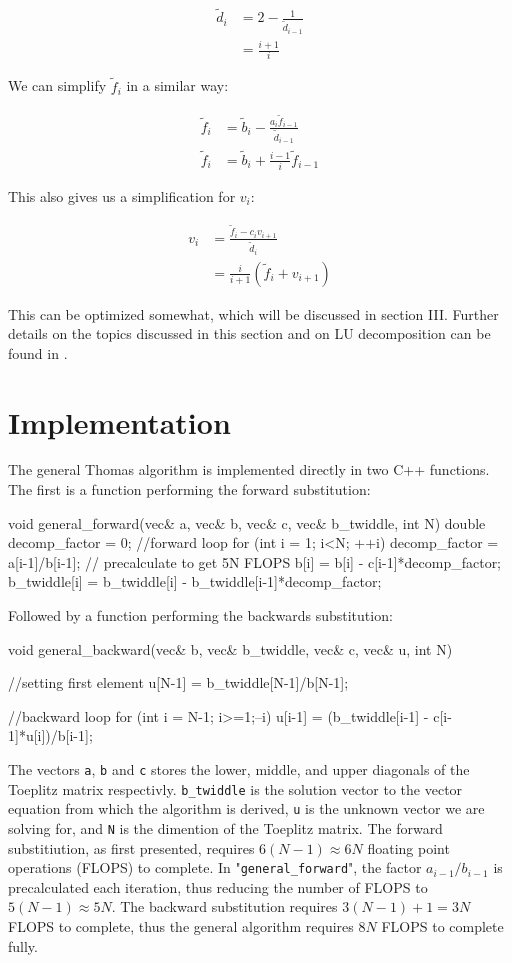 \documentclass[english,notitlepage,reprint,nofootinbib]{revtex4-1}  %
\begin{document}
\begin{align*}
\tilde{d}_i &= 2 - \frac{1}{\tilde{d}_{i-1}} \\
&= \frac{i+1}{i}
\end{align*}

We can simplify $\tilde{f}_i$ in a similar way:

\begin{align*}
\tilde{f}_i &= \tilde{b}_i - \frac{a_i \tilde{f}_{i-1}}{\tilde{d}_{i-1}} \\
\tilde{f}_i &= \tilde{b}_i + \frac{i-1}{i}\tilde{f}_{i-1}
\end{align*}

This also gives us a simplification for $v_i$:

\begin{align*}
v_i &= \frac{\tilde{f}_i - c_i v_{i+1}}{\tilde{d}_i} \\
&= \frac{i}{i+1}(\tilde{f}_i + v_{i+1})
\end{align*}

This can be optimized somewhat, which will be discussed in section III. Further details on the topics discussed in this section and on LU decomposition can be found in \citep{Hjorth-Jensen2015}.

\newpage


\section{Implementation} \label{sec:III}
The general Thomas algorithm is implemented directly in two C++ functions. The first is a function performing the forward substitution:
\begin{cpp}
void general_forward(vec& a, vec& b, vec& c, vec& b_twiddle, int N)
{
  double decomp_factor = 0;
  //forward loop
  for (int i = 1; i<N; ++i){
    decomp_factor = a[i-1]/b[i-1];  // precalculate to get 5N FLOPS
    b[i] = b[i] - c[i-1]*decomp_factor;
    b_twiddle[i] = b_twiddle[i] - b_twiddle[i-1]*decomp_factor;
  }
}
\end{cpp}
Followed by a function performing the backwards substitution:
\begin{cpp}
void general_backward(vec& b, vec& b_twiddle, vec& c, vec& u, int N)
{
  //setting first element
  u[N-1] = b_twiddle[N-1]/b[N-1];

  //backward loop
  for (int i = N-1; i>=1;--i){
    u[i-1] = (b_twiddle[i-1] - c[i-1]*u[i])/b[i-1];
  }
}
\end{cpp}
The vectors \verb+a+, \verb+b+ and \verb+c+ stores the lower, middle, and upper diagonals of the Toeplitz matrix respectivly. \verb+b_twiddle+ is the solution vector to the vector equation from which the algorithm is derived, \verb+u+ is the unknown vector we are solving for, and \verb+N+ is the dimention of the Toeplitz matrix. The forward substitiution, as first presented, requires \(6(N-1)\approx 6N\) floating point operations (FLOPS) to complete. In "\verb+general_forward+", the factor \(a_{i-1}/b_{i-1}\) is precalculated each iteration, thus reducing the number of FLOPS to \(5(N-1)\approx 5N\). The backward substitution requires \(3(N-1)+1 = 3N\) FLOPS to complete, thus the general algorithm requires \(8N\) FLOPS to complete fully.
\end{document}
